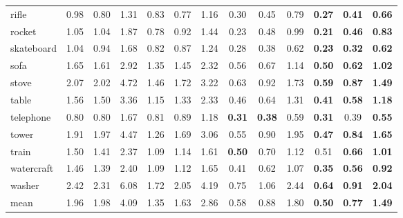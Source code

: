 \begin{table*}[t]
\begin{tabular}{l|ccc|ccc|ccc|ccc}
		rifle 		   & 0.98 & 0.80 & 1.31 & 0.83 & 0.77 & 1.16 & 0.30 & 0.45 & 0.79 & \textbf{0.27} & \textbf{0.41} & \textbf{0.66} \\
		rocket 		   & 1.05 & 1.04 & 1.87 & 0.78 & 0.92 & 1.44 & 0.23 & 0.48 & 0.99 & \textbf{0.21} & \textbf{0.46} & \textbf{0.83} \\
		skateboard 	   & 1.04 & 0.94 & 1.68 & 0.82 & 0.87 & 1.24 & 0.28 & 0.38 & 0.62 & \textbf{0.23} & \textbf{0.32} & \textbf{0.62} \\
		sofa 		   & 1.65 & 1.61 & 2.92 & 1.35 & 1.45 & 2.32 & 0.56 & 0.67 & 1.14 & \textbf{0.50} & \textbf{0.62} & \textbf{1.02} \\
		stove 		   & 2.07 & 2.02 & 4.72 & 1.46 & 1.72 & 3.22 & 0.63 & 0.92 & 1.73 & \textbf{0.59} & \textbf{0.87} & \textbf{1.49} \\
		table 		   & 1.56 & 1.50 & 3.36 & 1.15 & 1.33 & 2.33 & 0.46 & 0.64 & 1.31 & \textbf{0.41} & \textbf{0.58} & \textbf{1.18} \\
		telephone 	   & 0.80 & 0.80 & 1.67 & 0.81 & 0.89 & 1.18 & \textbf{0.31} & \textbf{0.38} & 0.59 & \textbf{0.31} & 0.39 & \textbf{0.55} \\
		tower 		   & 1.91 & 1.97 & 4.47 & 1.26 & 1.69 & 3.06 & 0.55 & 0.90 & 1.95 & \textbf{0.47} & \textbf{0.84} & \textbf{1.65} \\
		train 		   & 1.50 & 1.41 & 2.37 & 1.09 & 1.14 & 1.61 & \textbf{0.50} & 0.70 & 1.12 & 0.51 & \textbf{0.66} & \textbf{1.01} \\
		watercraft 	   & 1.46 & 1.39 & 2.40 & 1.09 & 1.12 & 1.65 & 0.41 & 0.62 & 1.07 & \textbf{0.35} & \textbf{0.56} & \textbf{0.92} \\
		washer 		   & 2.42 & 2.31 & 6.08 & 1.72 & 2.05 & 4.19 & 0.75 & 1.06 & 2.44 & \textbf{0.64} & \textbf{0.91} & \textbf{2.04} \\
		\midrule[0.3pt]
		mean 		   & 1.96 & 1.98 & 4.09 & 1.35 & 1.63 & 2.86 & 0.58 & 0.88 & 1.80 & \textbf{0.50} & \textbf{0.77} & \textbf{1.49} \\
		\bottomrule[1pt]
	\end{tabular}
	
	\label{table:shapenet55_more}
\end{table*}



